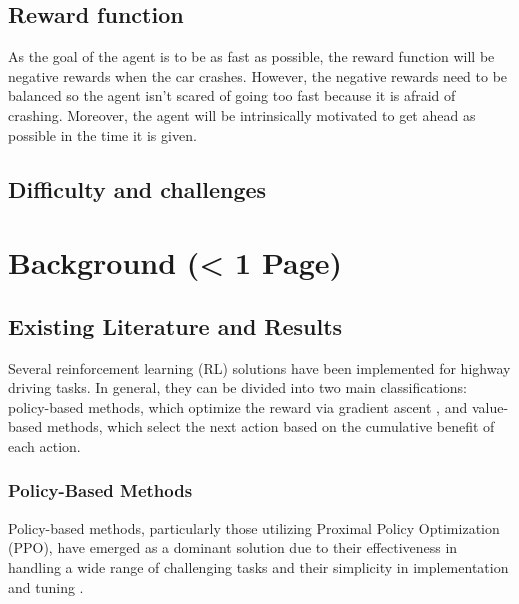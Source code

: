 \documentclass{article}
\begin{document}
\subsection{Reward function}
As the goal of the agent is to be as fast as possible, the reward function will be negative rewards when the car crashes. However, the negative rewards need to be balanced so the agent isn't scared of going too fast because it is afraid of crashing. Moreover, the agent will be intrinsically motivated to get ahead as possible in the time it is given.

\subsection{Difficulty and challenges}


\section{Background (< 1 Page)}

\subsection{Existing Literature and Results}
Several reinforcement learning (RL) solutions have been implemented for highway driving tasks. In general, they can be divided into two main classifications: policy-based methods, which optimize the reward via gradient ascent \citep{sutton_policy_1999}, and value-based methods, which select the next action based on the cumulative benefit of each action. %

\subsubsection{Policy-Based Methods}
Policy-based methods, particularly those utilizing Proximal Policy Optimization (PPO), have emerged as a dominant solution due to their effectiveness in handling a wide range of challenging tasks and their simplicity in implementation and tuning \citep{schulman_proximal_2017}. 
\end{document}
